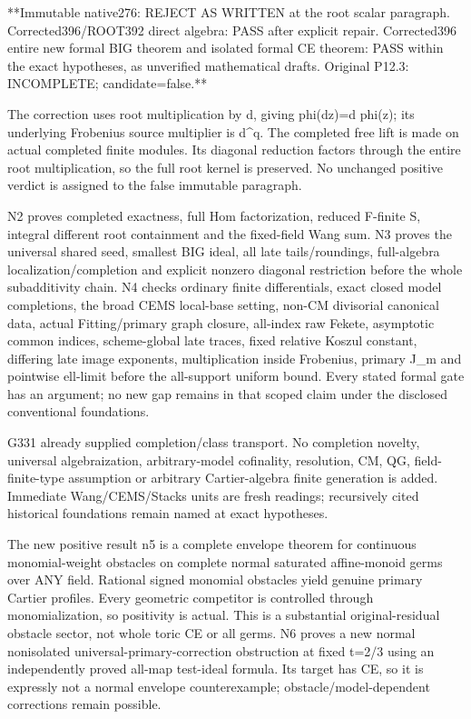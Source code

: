\documentclass[11pt]{article}
\begin{document}
**Immutable native276: REJECT AS WRITTEN at the root scalar paragraph. Corrected396/ROOT392 direct algebra: PASS after explicit repair. Corrected396 entire new formal BIG theorem and isolated formal CE theorem: PASS within the exact hypotheses, as unverified mathematical drafts. Original P12.3: INCOMPLETE; candidate=false.**

The correction uses root multiplication by d, giving phi(dz)=d phi(z); its underlying Frobenius source multiplier is d\textasciicircum{}q. The completed free lift is made on actual completed finite modules. Its diagonal reduction factors through the entire root multiplication, so the full root kernel is preserved. No unchanged positive verdict is assigned to the false immutable paragraph.

N2 proves completed exactness, full Hom factorization, reduced F-finite S, integral different root containment and the fixed-field Wang sum. N3 proves the universal shared seed, smallest BIG ideal, all late tails/roundings, full-algebra localization/completion and explicit nonzero diagonal restriction before the whole subadditivity chain. N4 checks ordinary finite differentials, exact closed model completions, the broad CEMS local-base setting, non-CM divisorial canonical data, actual Fitting/primary graph closure, all-index raw Fekete, asymptotic common indices, scheme-global late traces, fixed relative Koszul constant, differing late image exponents, multiplication inside Frobenius, primary J\_m and pointwise ell-limit before the all-support uniform bound. Every stated formal gate has an argument; no new gap remains in that scoped claim under the disclosed conventional foundations.

G331 already supplied completion/class transport. No completion novelty, universal algebraization, arbitrary-model cofinality, resolution, CM, QG, field-finite-type assumption or arbitrary Cartier-algebra finite generation is added. Immediate Wang/CEMS/Stacks units are fresh readings; recursively cited historical foundations remain named at exact hypotheses.

The new positive result n5 is a complete envelope theorem for continuous monomial-weight obstacles on complete normal saturated affine-monoid germs over ANY field. Rational signed monomial obstacles yield genuine primary Cartier profiles. Every geometric competitor is controlled through monomialization, so positivity is actual. This is a substantial original-residual obstacle sector, not whole toric CE or all germs. N6 proves a new normal nonisolated universal-primary-correction obstruction at fixed t=2/3 using an independently proved all-map test-ideal formula. Its target has CE, so it is expressly not a normal envelope counterexample; obstacle/model-dependent corrections remain possible.
\end{document}
